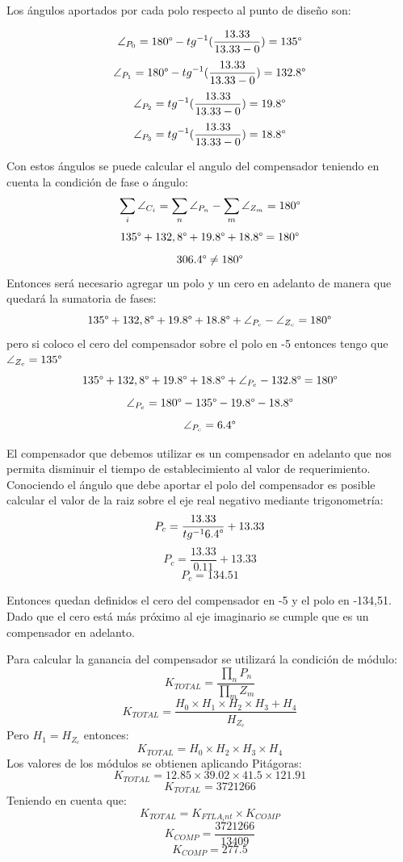 \documentclass[a4paper,11pt]{article}
\begin{document}
Los ángulos aportados por cada polo respecto al punto de diseño son:\\
\begin{center}
$$\angle_{P_0}=180\degree-tg^{-1}(\frac{13.33}{13.33-0})=135\degree$$
$$\angle_{P_1}=180\degree-tg^{-1}(\frac{13.33}{13.33-0})=132.8\degree$$
$$\angle_{P_2}=tg^{-1}(\frac{13.33}{13.33-0})=19.8\degree$$
$$\angle_{P_3}=tg^{-1}(\frac{13.33}{13.33-0})=18.8\degree$$
\end{center}


Con estos ángulos se puede calcular el angulo del compensador teniendo en cuenta la condición de fase o ángulo:
$$\sum_{i}\angle_{C_i}=\sum_{n}\angle_{P_n} - \sum_{m}\angle_{Z_m}=180\degree$$
$$135\degree+132,8\degree+19.8\degree+18.8\degree = 180\degree$$
$$306.4\degree \ne 180\degree$$
Entonces será necesario agregar un polo y un cero en adelanto de manera que quedará la sumatoria de fases:
$$135\degree+132,8\degree+19.8\degree+18.8\degree+ \angle_{P_c} - \angle_{Z_c}= 180\degree$$
pero si coloco el cero del compensador sobre el polo en -5 entonces tengo que $\angle_{Z_c}=135 \degree $
$$135\degree+132,8\degree+19.8\degree+18.8\degree+ \angle_{P_c} - 132.8\degree= 180\degree$$
$$\angle_{P_c} = 180\degree - 135\degree-19.8\degree-18.8\degree$$
$$\angle_{P_c} = 6.4\degree$$

El compensador que debemos utilizar es un compensador en adelanto que nos permita disminuir el tiempo de establecimiento al valor de requerimiento.
Conociendo el ángulo que debe aportar el polo del compensador es posible calcular el valor de la raiz sobre el eje real negativo mediante trigonometría:
$$P_c=\frac{13.33}{tg^{-1}6.4\degree}+13.33$$
$$P_c=\frac{13.33}{0.11}+13.33$$
$$P_c=134.51$$

Entonces quedan definidos el cero del compensador en -5 y el polo en -134,51. Dado que el cero está más próximo al eje imaginario se cumple que es un compensador en adelanto.

Para calcular la ganancia del compensador se utilizará la condición de módulo:
$$K_{TOTAL}=\frac{\prod_n P_n}{\prod_m Z_m}$$
$$K_{TOTAL}=\frac{H_0\times H_1\times H_2\times H_3+H_4}{H_{Z_c}}$$
Pero $H_1=H_{Z_c}$ entonces:
$$K_{TOTAL}=H_0\times H_2\times H_3\times H_4$$
Los valores de los módulos se obtienen aplicando Pitágoras:
$$K_{TOTAL}=12.85\times 39.02\times 41.5\times 121.91$$
$$K_{TOTAL}=3721266$$
Teniendo en cuenta que:
$$K_{TOTAL}=K_{FTLA_int}\times K_{COMP}$$
$$K_{COMP}=\frac{3721266}{13409}$$
$$K_{COMP}=277.5$$
\end{document}
